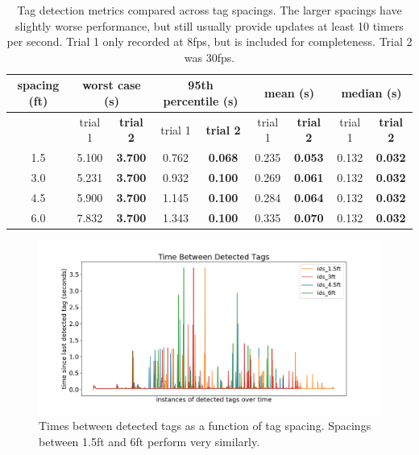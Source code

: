 \documentclass{article}
\begin{document}
    \begin{table}[H]
      \centering
      \begin{tabular}{|c|c|c|c|c|c|c|c|c|} \hline
        spacing (ft) & \multicolumn{2}{c}{worst case (s)} & \multicolumn{2}{c}{95th percentile (s)} & \multicolumn{2}{c}{mean (s)} & \multicolumn{2}{c|}{median (s)} \\ \hline
            & trial 1 & \textbf{trial 2} & trial 1 & \textbf{trial 2} & trial 1 & \textbf{trial 2} & trial 1 & \textbf{trial 2} \\ \hline
        1.5 & 5.100 & \textbf{3.700} & 0.762 & \textbf{0.068} & 0.235 & \textbf{0.053} & 0.132 & \textbf{0.032} \\ \hline
        3.0 & 5.231 & \textbf{3.700} & 0.932 & \textbf{0.100} & 0.269 & \textbf{0.061} & 0.132 & \textbf{0.032} \\ \hline
        4.5 & 5.900 & \textbf{3.700} & 1.145 & \textbf{0.100} & 0.284 & \textbf{0.064} & 0.132 & \textbf{0.032} \\ \hline
        6.0 & 7.832 & \textbf{3.700} & 1.343 & \textbf{0.100} & 0.335 & \textbf{0.070} & 0.132 & \textbf{0.032} \\ \hline
      \end{tabular}
      \caption{Tag detection metrics compared across tag spacings.
      The larger spacings have slightly worse performance, but still usually provide updates at least 10 timers per second.
      Trial 1 only recorded at 8fps, but is included for completeness. Trial 2 was 30fps.}
      \label{table:spacing_timing}
    \end{table}

    \begin{figure}[H]
      \centering
      \includegraphics[width=1\linewidth]{./images/spacing_times.png}
      \caption{Times between detected tags as a function of tag spacing. Spacings between 1.5ft and 6ft perform very similarly.}
      \label{fig:spacing_timing}
    \end{figure}
\end{document}
